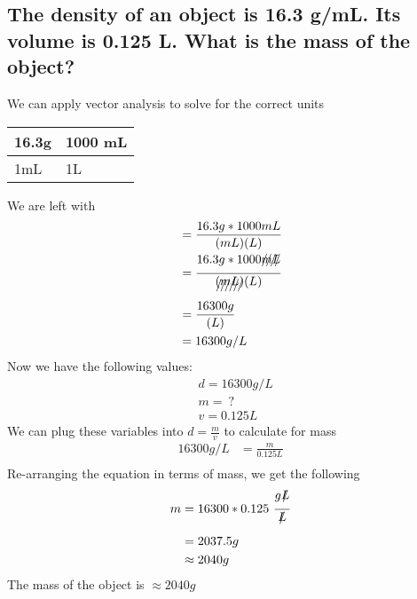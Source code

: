 \documentclass[11pt]{article}
\begin{document}
\subsection{The density of an object is 16.3 g/mL. Its volume is 0.125 L. What is the mass of the object?}
\label{sec:orgc60a873}
We can apply vector analysis to solve for the correct units
\begin{center}
\begin{tabular}{ll}
16.3g & 1000 mL\\
\hline
1mL & 1L\\
\end{tabular}
\end{center}
We are left with
\begin{align*}
&= \frac{16.3g * 1000mL}{(mL)(L)}\\
&= \frac{16.3g * 1000\xout{mL}}{\xout{(mL)}(L)}\\
&= \frac{16300g}{(L)}\\
&= 16300g/L
\end{align*}
Now we have the following values:
\begin{align*}
&d = 16300g/L\\
&m = \ ?\\
&v = 0.125L
\end{align*}
We can plug these variables into \(d=\frac{m}{v}\) to calculate for mass
\begin{align*}
16300{g}/{L} &=\frac{m}{0.125L}\\
\end{align*}
Re-arranging the equation in terms of mass, we get the following
\begin{align*}
m &= 16300 * 0.125\ \frac{g\xout{L}}{\xout{L}}\\
&= 2037.5g\\
&\approx 2040g
\end{align*}
The mass of the object is \(\approx 2040g\)
\end{document}
